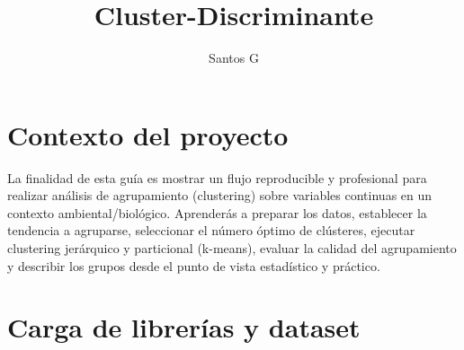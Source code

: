 \documentclass[
  spanish,
  11pt,
  a4paper,
  DIV=11,
  numbers=noendperiod]{scrartcl}
\title{Cluster-Discriminante}
\author{Santos G}
\date{}
\renewcommand*\contentsname{Tabla de contenidos}
\newcommand\contentsname{Tabla de contenidos}
\begin{document}
\maketitle

\renewcommand*\contentsname{Tabla de contenidos}
{
\hypersetup{linkcolor=}
\setcounter{tocdepth}{2}
\tableofcontents
}

\section{Contexto del proyecto}\label{contexto-del-proyecto}

La finalidad de esta guía es mostrar un flujo reproducible y profesional
para realizar análisis de agrupamiento (clustering) sobre variables
continuas en un contexto ambiental/biológico. Aprenderás a preparar los
datos, establecer la tendencia a agruparse, seleccionar el número óptimo
de clústeres, ejecutar clustering jerárquico y particional (k-means),
evaluar la calidad del agrupamiento y describir los grupos desde el
punto de vista estadístico y práctico.

\section{Carga de librerías y
dataset}\label{carga-de-libreruxedas-y-dataset}
\end{document}
